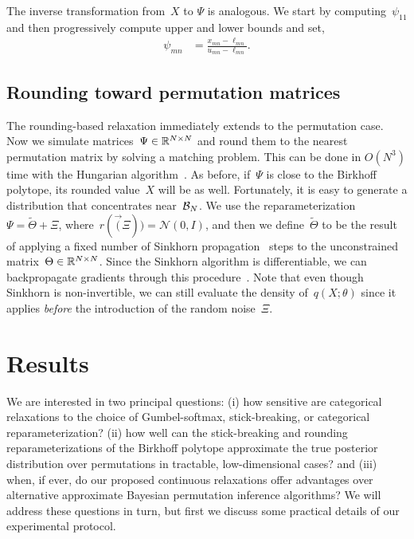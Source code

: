 \documentclass[twoside]{article}
\begin{document}
The inverse transformation from~$X$ to $\Psi$ is analogous.
We start by computing~$\psi_{11}$ and then progressively compute
upper and lower bounds and set,
\begin{align}
\psi_{mn} &= \frac{x_{mn} - \ell_{mn}}{u_{mn} - \ell_{mn}}.
\end{align}


\subsection{Rounding toward permutation matrices}
\label{sub:rounding}
The rounding-based relaxation immediately extends to the permutation
case.  Now we simulate matrices~$\Psi \in \mathbb{R}^{N \times N}$ and
round them to the nearest permutation matrix by solving a matching
problem.  This can be done in $O(N^3)$ time with the Hungarian
algorithm~\citep{kuhn1955hungarian, munkres1957algorithms}.  As
before, if~$\Psi$ is close to the Birkhoff polytope, its rounded
value~$X$ will be as well.  Fortunately, it is easy to generate a
distribution that concentrates near~$\mathcal{B}_N$.  We use the
reparameterization~${\Psi = \widetilde{\Theta} + \Xi}$,
where~${r(\vec(\Xi)) = \mathcal{N}(0, I)}$, and then we
define~${\widetilde{\Theta}}$ to be the
result of applying a fixed number of Sinkhorn propagation~\citep{knight2008sinkhorn} steps
to the unconstrained matrix~$\Theta \in \mathbb{R}^{N \times N}$.
Since the Sinkhorn algorithm is differentiable, we can backpropagate
gradients through this procedure~\citep[c.f.][]{adams2011ranking}.
Note that even though Sinkhorn is non-invertible, we can still
evaluate the density of~$q(X; \theta)$ since it applies \emph{before}
the introduction of the random noise~$\Xi$. 


\section{Results}
\label{sec:results}

We are interested in two principal questions: (i) how sensitive
are categorical relaxations to the choice of Gumbel-softmax,
stick-breaking, or categorical reparameterization? (ii) how
well can the stick-breaking and rounding reparameterizations
of the Birkhoff polytope approximate the true posterior distribution
over permutations in tractable, low-dimensional cases? and (iii)
when, if ever, do our proposed continuous relaxations offer
advantages over alternative approximate Bayesian permutation
inference algorithms?  We will address these questions in turn,
but first we discuss some practical details of our experimental
protocol.
\end{document}
